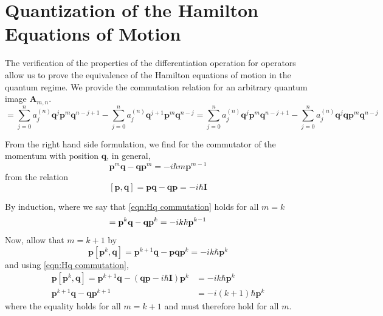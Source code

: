\documentclass[a4paper]{article}
\theoremstyle{definition}
\begin{document}
\section{Quantization of the Hamilton Equations of Motion}
The verification of the properties of the differentiation operation for operators allow us to prove the equivalence of the Hamilton equations of motion in the quantum regime. We provide the commutation relation for an arbitrary quantum image $\textbf{A}_{m,n}$.
\begin{equation}
	[\textbf{A}_{m,n},\textbf{q}]=\sum_{j=0}^na_j^{(n)}\textbf{q}^{j}\textbf{p}^m\textbf{q}^{n-j+1}-\sum_{j=0}^na_j^{(n)}\textbf{q}^{j+1}\textbf{p}^m\textbf{q}^{n-j}=\sum_{j=0}^na_j^{(n)}\textbf{q}^{j}\textbf{p}^m\textbf{q}^{n-j+1}-\sum_{j=0}^na_j^{(n)}\textbf{q}^{j}\textbf{q}\textbf{p}^m\textbf{q}^{n-j}
\end{equation}

From the right hand side formulation, we find for the commutator of the momentum with position $\textbf{q}$, in general, 
\begin{equation}
	\textbf{p}^m\textbf{q}-\textbf{q}\textbf{p}^m=-i\hbar m\textbf{p}^{m-1}
\end{equation}
from the relation
\begin{equation}\label{eqn:Hq commutation}
	[\textbf{p},\textbf{q}]=\textbf{p}\textbf{q}-\textbf{q}\textbf{p}=-i\hbar\textbf{I}
\end{equation}

By induction, where we say that \ref{eqn:Hq commutation} holds for all $m=k$
\begin{equation}
	[\textbf{p}^k,\textbf{q}]=\textbf{p}^k\textbf{q}-\textbf{q}\textbf{p}^k=-ik\hbar\textbf{\textbf{p}}^{k-1}
\end{equation}
Now, allow that $m=k+1$ by
\begin{equation}
	\textbf{p}[\textbf{p}^k,\textbf{q}]=\textbf{p}^{k+1}\textbf{q}-\textbf{p}\textbf{q}\textbf{p}^{k}=-ik\hbar\textbf{p}^{k}
\end{equation}
and using \ref{eqn:Hq commutation},
\begin{align}
	\textbf{p}[\textbf{p}^k,\textbf{q}]=\textbf{p}^{k+1}\textbf{q}-(\textbf{q}\textbf{p}-i\hbar\textbf{I})\textbf{p}^{k}&=-ik\hbar\textbf{p}^{k} \\
	\textbf{p}^{k+1}\textbf{q}-\textbf{q}\textbf{p}^{k+1}&=-i(k+1)\hbar\textbf{p}^{k}
\end{align}
where the equality holds for all $m=k+1$ and must therefore hold for all $m$.
\end{document}
